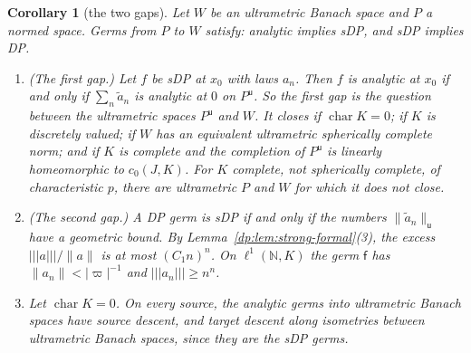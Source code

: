 \documentclass[11pt]{amsart}
\newtheorem{corollary}[theorem]{Corollary}
\theoremstyle{definition}
\theoremstyle{remark}
\numberwithin{equation}{section}
\newcommand{\N}{\mathbb N}
\newcommand{\abs}[1]{\lvert #1\rvert}
\newcommand{\norm}[1]{\lVert #1\rVert}
\theoremstyle{plain}
\theoremstyle{definition}
\theoremstyle{plain}
\begin{document}
\begin{corollary}[the two gaps]\label{dp:cor:two-gaps}
Let $W$ be an ultrametric Banach space and $P$ a normed space. Germs from $P$ to $W$ satisfy: analytic implies sDP, and sDP implies DP.
\begin{enumerate}
\item \textup{(The first gap.)} Let $f$ be sDP at $x_0$ with laws $a_n$. Then $f$ is analytic at $x_0$ if and only if $\sum_n\tilde a_n$ is analytic at $0$ on $P^{\mathsf u}$. So the first gap is the question between the ultrametric spaces $P^{\mathsf u}$ and $W$. It closes if $\operatorname{char}K=0$; if $K$ is discretely valued; if $W$ has an equivalent ultrametric spherically complete norm; and if $K$ is complete and the completion of $P^{\mathsf u}$ is linearly homeomorphic to $c_0(J,K)$. For $K$ complete, not spherically complete, of characteristic $p$, there are ultrametric $P$ and $W$ for which it does not close.
\item \textup{(The second gap.)} A DP germ is sDP if and only if the numbers $\norm{\tilde a_n}_{\mathsf u}$ have a geometric bound. By Lemma~\ref{dp:lem:strong-formal}(3), the excess $\lvert\!\lvert\!\lvert a\rvert\!\rvert\!\rvert/\norm a$ is at most $(C_1n)^n$. On $\ell^1(\N,K)$ the germ $\mathsf f$ has $\norm{a_n}<\abs\varpi^{-1}$ and $\lvert\!\lvert\!\lvert a_n\rvert\!\rvert\!\rvert\ge n^n$.
\item Let $\operatorname{char}K=0$. On every source, the analytic germs into ultrametric Banach spaces have source descent, and target descent along isometries between ultrametric Banach spaces, since they are the sDP germs.
\end{enumerate}
\end{corollary}
\end{document}

